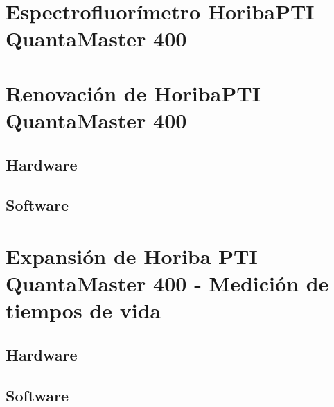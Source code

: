 \section{Espectrofluorímetro HoribaPTI QuantaMaster 400}
\section{Renovación de HoribaPTI QuantaMaster 400}
\subsection{Hardware}
\subsection{Software}
\section{Expansión de Horiba PTI QuantaMaster 400 - Medición de tiempos de vida}
\subsection{Hardware}
\subsection{Software}
